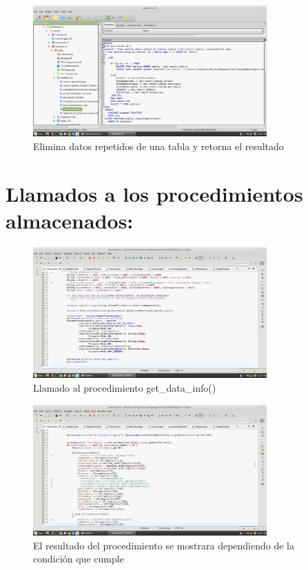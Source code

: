 \documentclass[12pt,oneside]{book}
\begin{document}
\begin{figure}[H]
	\centering
	\includegraphics[width=0.8\textwidth]{remove_repetitions2.png}
	\caption{Elimina datos repetidos de una tabla y retorna el resultado}
	\label{o1}
\end{figure}
	
	\section{Llamados a los procedimientos almacenados:}

	\begin{figure}[H]
		\centering
		\includegraphics[width=0.8\textwidth]{getDataInfo().png}
		\caption{Llamado al procedimiento get\_data\_info()}
		\label{h1}
	\end{figure}
	
	\begin{figure}[H]
		\centering
		\includegraphics[width=0.8\textwidth]{getDataInfo2().png}
		\caption{El resultado del procedimiento se mostrara dependiendo de la condición que cumple }
		\label{b1}
	\end{figure}
	
\end{document}
